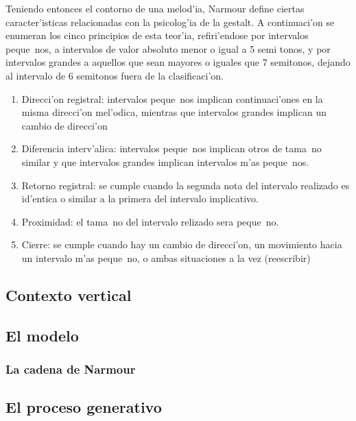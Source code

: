 Teniendo entonces el contorno de una melod'ia, Narmour define ciertas caracter'isticas relacionadas con la psicolog'ia de la gestalt. A continuaci'on 
se enumeran los cinco principios de esta teor'ia, refiri'endose por intervalos peque~nos, a intervalos de valor absoluto menor o igual a 5 semi tonos, y por intervalos
grandes a aquellos que sean mayores o iguales que 7 semitonos, dejando al intervalo de 6 semitonos fuera de la clasificaci'on.
\begin{enumerate}
 \item Direcci'on registral: intervalos peque~nos implican continuaci'ones en la misma direcci'on mel'odica, mientras que intervalos grandes implican un cambio de direcci'on
 \item Diferencia interv'alica: intervalos peque~nos implican otros de tama~no similar y que intervalos grandes implican intervalos m'as peque~nos. 
 \item Retorno registral: se cumple cuando la segunda nota del intervalo realizado es id'entica o similar a la primera del intervalo implicativo.
 \item Proximidad: el tama~no del intervalo relizado sera peque~no.
 \item Cierre: se cumple cuando hay un cambio de direcci'on, un movimiento hacia un intervalo m'as peque~no, o ambas situaciones a la vez (\alert{reescribir})

\end{enumerate}

\subsection{Contexto vertical}

\subsection{El modelo}

\subsubsection{La cadena de Narmour}

\subsection{El proceso generativo}
